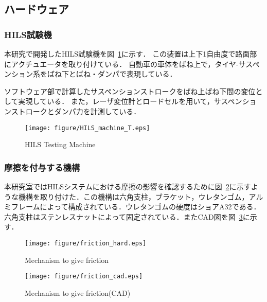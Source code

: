 \documentclass[a4paper,12pt]{article_vdlab_sotsuron}
\begin{document}
\subsection{ハードウェア}
\subsubsection{HILS試験機}本研究で開発したHILS試験機を図~\ref{HILSmachine}に示す．
この装置は上下1自由度で路面部にアクチュエータを取り付けている．
自動車の車体をばね上で，タイヤ-サスペンション系をばね下とばね・ダンパで表現している．
\par
ソフトウェア部で計算したサスペンションストロークをばね上ばね下間の変位として実現している．
また，レーザ変位計とロードセルを用いて，サスペンションストロークとダンパ力を計測している．

\vspace{24mm}
\begin{figure}[h]
  \begin{center}
  \texttt{[image: figure/HILS\_machine\_T.eps]}
  \vspace{4mm}
   \caption{HILS Testing Machine}
  \label{HILSmachine}
  \end{center}
\end{figure}

\newpage
\subsubsection{摩擦を付与する機構}
本研究室ではHILSシステムにおける摩擦の影響を確認するために図~\ref{friction_hard}に示すような機構を取り付けた．この機構は六角支柱，ブラケット，ウレタンゴム，アルミフレームによって構成されている．ウレタンゴムの硬度はショアA32である．六角支柱はステンレスナットによって固定されている．またCAD図を図~\ref{friction_cad}に示す．

\vspace{10mm}
\begin{figure}[h]
  \begin{center}
  \texttt{[image: figure/friction\_hard.eps]}
  \vspace{4mm}
   \caption{Mechanism to give friction}
  \label{friction_hard}
  \end{center}
\end{figure}

\vspace{10mm}
\begin{figure}[h]
  \begin{center}
  \texttt{[image: figure/friction\_cad.eps]}
  \vspace{4mm}
   \caption{Mechanism to give friction(CAD)}
  \label{friction_cad}
  \end{center}
\end{figure}
\end{document}

